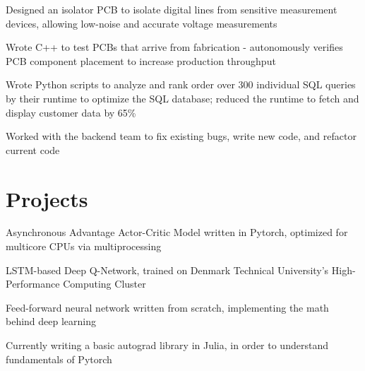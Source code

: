 \documentclass[]{deedy-resume-openfont}
\begin{document}
\vspace{8pt}

\begin{tightemize}
    \item Designed an isolator PCB to isolate digital lines from sensitive measurement devices, allowing low-noise and accurate voltage measurements
    \item Wrote C++ to test PCBs that arrive from fabrication - autonomously verifies PCB component placement to increase production throughput
\end{tightemize}

\vspace{8pt}

\begin{tightemize}
    \item Wrote Python scripts to analyze and rank order over 300 individual SQL queries by their runtime to optimize the SQL database; reduced the runtime to fetch and display customer data by 65\%
    \item Worked with the backend team to fix existing bugs, write new code, and refactor current code
\end{tightemize}

\vspace{12pt}


\section{Projects}

\begin{tightemize}
    \item Asynchronous Advantage Actor-Critic Model written in Pytorch, optimized for multicore CPUs via multiprocessing
    \item LSTM-based Deep Q-Network, trained on Denmark Technical University's High-Performance Computing Cluster
    \item Feed-forward neural network written from scratch, implementing the math behind deep learning
    \item Currently writing a basic autograd library in Julia, in order to understand fundamentals of Pytorch
\end{tightemize}

\vspace{8pt}
\end{document}
